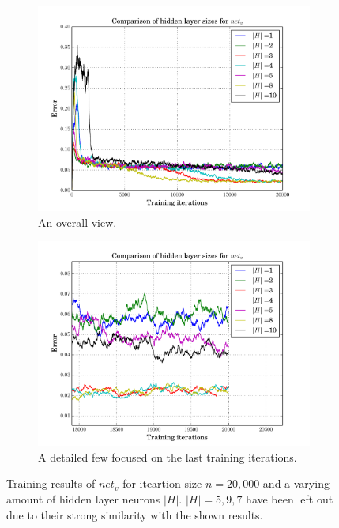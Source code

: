 \documentclass[10pt,a4paper,DIV=11]{scrreprt}
\begin{document}
\begin{figure}[H]
\centering
\begin{subfigure}{\textwidth}
  \centering
  \includegraphics[width=0.8\linewidth]{files/supervised/hv.pdf}
  \caption{An overall view.}
  \label{fig:hvo}
\end{subfigure}%
\newline
\begin{subfigure}{\textwidth}
  \centering
  \includegraphics[width=0.8\linewidth]{files/supervised/hvend.pdf}
  \caption{A detailed few focused on the last training iterations.}
  \label{fig:hvend}
\end{subfigure}
\newline
\caption{Training results of $net_v$ for iteartion size $n = 20,000$ and a 
         varying amount of hidden layer neurons $|H|$. $|H| = 5,9,7$ have 
         been left out due to their strong similarity with the shown results.}
\label{fig:hv}
\end{figure}
\end{document}
